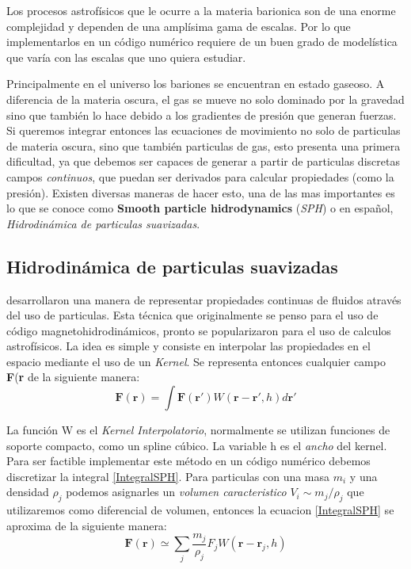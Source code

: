 Los procesos astrof\'isicos que le ocurre a la materia barionica son de una enorme complejidad y dependen de una ampl\'isima gama de escalas. Por lo que implementarlos en un c\'odigo num\'erico requiere de un buen grado de model\'istica que var\'ia con las escalas que uno quiera estudiar. 

Principalmente en el universo los bariones se encuentran en estado gaseoso. A diferencia de la materia oscura, el gas se mueve no solo dominado por la gravedad sino que tambi\'en lo hace debido a los gradientes de presi\'on que generan fuerzas. Si queremos integrar entonces las ecuaciones de movimiento no solo de particulas de materia oscura, sino que tambi\'en particulas de gas, esto presenta una primera dificultad, ya que debemos ser capaces de generar a partir de particulas discretas campos \textit{continuos}, que puedan ser derivados para calcular propiedades (como la presi\'on). Existen diversas maneras de hacer esto, una de las mas importantes es lo que se conoce como \textbf{Smooth particle hidrodynamics} (\textit{SPH}) o en espa\~nol, \textit{Hidrodin\'amica de particulas suavizadas}.

\subsection{Hidrodin\'amica de particulas suavizadas}
\label{SPH}

\citet{Gingold1977} desarrollaron una manera de representar propiedades continuas de fluidos atrav\'es del uso de particulas. Esta t\'ecnica que originalmente se penso para el uso de c\'odigo magnetohidrodin\'amicos, pronto se popularizaron para el uso de calculos astrof\'isicos. La idea es simple y consiste en interpolar las propiedades en el espacio mediante el uso de un \textit{Kernel}. Se representa entonces cualquier campo \textbf{F}(\textbf{r} de la siguiente manera:
\begin{equation}
    \textbf{F}(\textbf{r})=\int \textbf{F}(\textbf{r}')W(\textbf{r}-\textbf{r}',h)d\textbf{r}'
    \label{IntegralSPH}
\end{equation}{}

La funci\'on W es el \textit{Kernel Interpolatorio}, normalmente se utilizan funciones de soporte compacto, como un spline c\'ubico. La variable h es el \textit{ancho} del kernel. Para ser factible implementar este m\'etodo en un c\'odigo num\'erico debemos discretizar la integral \ref{IntegralSPH}. Para particulas con una masa $m_{i}$ y una densidad $\rho_{j}$ podemos asignarles un \textit{volumen caracteristico} $V_{i}\sim m_{j}/\rho_{j}$ que utilizaremos como diferencial de volumen, entonces la ecuacion \ref{IntegralSPH} se aproxima de la siguiente manera:
\begin{equation}
    \textbf{F}(\textbf{r})\simeq \sum_{j} \frac{m_{j}}{\rho_{j}} F_{j} W(\textbf{r}-\textbf{r}_{j},h)
    \label{IntegralSPHDiscreta}
\end{equation}{}

